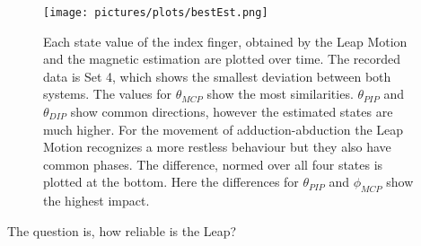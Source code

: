 \begin{figure}
\centering
\texttt{[image: pictures/plots/bestEst.png]}
\caption[Comparison of estimated states, which fit best to Leap data]
{Each state value of the index finger, obtained by the Leap Motion and the magnetic estimation are plotted over time. The recorded data is Set 4, which shows the smallest deviation between both systems. The values for $ \theta_{MCP} $ show the most similarities. $ \theta_{PIP} $ and $ \theta_{DIP} $ show common directions, however the estimated states are much higher. For the movement of adduction-abduction the Leap Motion recognizes a more restless behaviour but they also have common phases. The difference, normed over all four states is plotted at the bottom. Here the differences for $ \theta_{PIP} $ and $ \phi_{MCP} $ show the highest impact.}
\label{fig:bestLeap}
\end{figure}
The question is, how reliable is the Leap?



